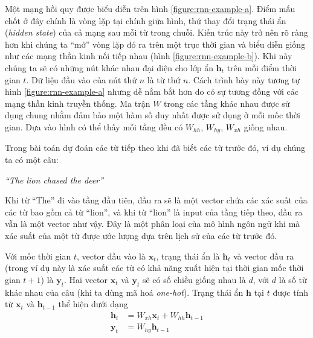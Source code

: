 Một mạng hồi quy được biểu diễn trên hình \ref{figure:rnn-example-a}. Điểm mấu chốt ở đây chính là vòng lặp tại chính giữa hình, thứ thay đổi trạng thái ẩn (\textit{hidden state}) của cả mạng sau mỗi từ trong chuỗi. Kiến trúc này trở nên rõ ràng hơn khi chúng ta “mở” vòng lặp đó ra trên một trục thời gian và biểu diễn giống như các mạng thần kinh nối tiếp nhau (hình \ref{figure:rnn-example-b}). Khi này chúng ta sẽ có những nút khác nhau đại diện cho lớp ẩn $\mathbf h_t$ trên mỗi điểm thời gian $t$. Dữ liệu đầu vào của nút thứ $n$ là từ thứ $n$. Cách trình bày này tương tự hình \ref{figure:rnn-example-a} nhưng dễ nắm bắt hơn do có sự tương đồng với các mạng thần kinh truyền thống. Ma trận $W$ trong các tầng khác nhau được sử dụng chung nhằm đảm bảo một hàm số duy nhất được sử dụng ở mỗi mốc thời gian. Dựa vào hình có thể thấy mỗi tầng đều có $W_{hh}$, $W_{hy}$, $W_{xh}$ giống nhau.

Trong bài toán dự đoán các từ tiếp theo khi đã biết các từ trước đó, ví dụ chúng ta có một câu:\newline
\centerline{\textit{``The lion chased the deer''} \cite{Aggarwal2023-zk}}
Khi từ ``The'' đi vào tầng đầu tiên, đầu ra sẽ là một vector chứa các xác suất của các từ bao gồm cả từ ``lion'', và khi từ ``lion'' là input của tầng tiếp theo, đầu ra vẫn là một vector như vậy. Đây là một phân loại của mô hình ngôn ngữ khi mà xác suất của một từ được ước lượng dựa trên lịch sử của các từ trước đó.

Với mốc thời gian $t$, vector đầu vào là $\mathbf x_t$, trạng thái ẩn là $\mathbf h_t$ và vector đầu ra  (trong ví dụ này là xác suất các từ có khả năng xuất hiện tại thời gian mốc thời gian $t+1$) là $\mathbf y_t$. Hai vector $\mathbf x_t$ và $\mathbf y_t$ sẽ có số chiều giống nhau là $d$, với $d$ là số từ khác nhau của câu (khi ta dùng mã hoá \textit{one-hot}). Trạng thái ẩn $\mathbf h$ tại $t$ được tính từ $\mathbf x_t$ và $\mathbf h_{t-1}$ thể hiện dưới dạng
\begin{align}
    \mathbf h_t & =W_{xh}\mathbf x_t+W_{hh}\mathbf h_{t-1}\label{equation:rnn-h} \\
    \mathbf y_t & =W_{hy}\mathbf h_{t-1}\label{equation:rnn-y}
\end{align}


